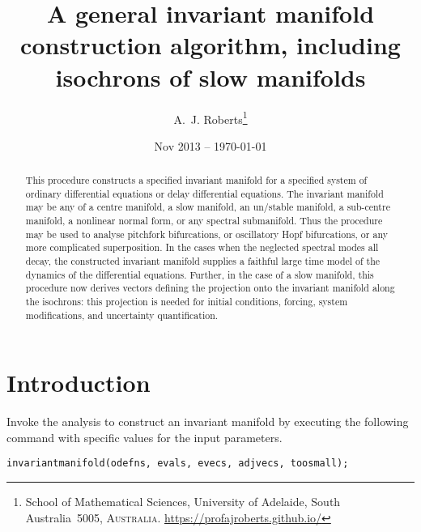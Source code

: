 \documentclass[11pt,a5paper]{article}
\title{A general invariant manifold construction algorithm,
including isochrons of slow manifolds}
\author{A.~J. Roberts\thanks{School of Mathematical
Sciences, University of Adelaide, South Australia~5005,
\textsc{Australia}. \url{https://profajroberts.github.io/}}}
\date{Nov 2013 -- \today}
\begin{document}
\maketitle

\begin{abstract}
This procedure constructs a specified invariant manifold for a specified system of ordinary differential equations or delay differential equations. 
The invariant manifold may be any of a centre manifold, a slow manifold, an un/stable manifold, a sub-centre manifold, a nonlinear normal form, or any spectral submanifold.
Thus the procedure may be used to analyse pitchfork bifurcations, or oscillatory Hopf bifurcations, or any more complicated superposition. 
In the cases when the neglected spectral modes all decay, the constructed invariant manifold supplies a faithful large time model of the dynamics of the differential equations. 
Further, in the case of a slow manifold, this procedure now derives vectors defining the projection onto the invariant manifold along the isochrons: this projection is needed for initial conditions, forcing, system modifications, and uncertainty quantification.
\end{abstract}

\tableofcontents

\section{Introduction}

Invoke the analysis to construct an invariant manifold by executing the following command 
with specific values for the input parameters.
\begin{verbatim}
invariantmanifold(odefns, evals, evecs, adjvecs, toosmall);
\end{verbatim}
\end{document}
